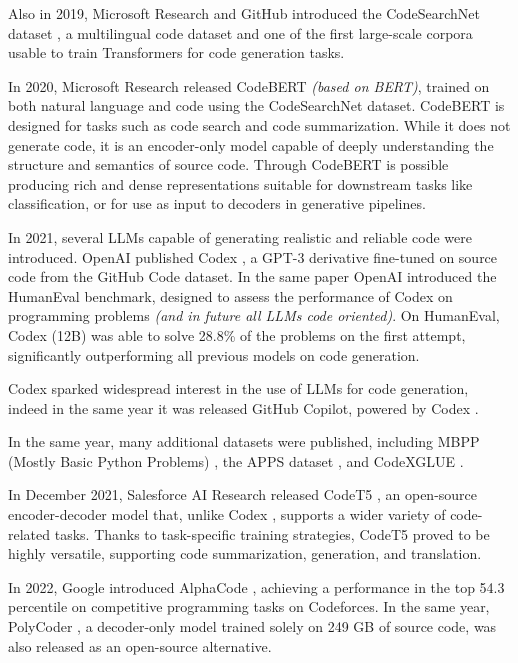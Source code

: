 Also in 2019, Microsoft Research and GitHub introduced the 
CodeSearchNet dataset \cite{husain2019codesearchnet}, a 
multilingual code dataset and one of the first large-scale 
corpora usable to train Transformers for code generation tasks.

In 2020, Microsoft Research released CodeBERT 
\cite{feng2020codebert} \textit{(based on BERT)}, 
trained on both natural 
language and code using the CodeSearchNet dataset. 
CodeBERT is designed for tasks such as code search 
and code summarization. While it does not generate code, 
it is an encoder-only model capable of deeply understanding 
the structure and semantics of source code. Through 
CodeBERT is possible producing rich 
and dense representations suitable for downstream tasks like 
classification, or for use as input to decoders in generative 
pipelines.

In 2021, several LLMs capable of generating realistic and 
reliable code were introduced. OpenAI published Codex 
\cite{chen2021codex}, a GPT-3 \cite{brown2020language} derivative fine-tuned on 
source code from the GitHub Code dataset. In the same paper 
OpenAI introduced the HumanEval benchmark, designed to assess the 
performance of Codex \cite{chen2021codex} on programming problems 
\textit{(and in future all LLMs code oriented)}.
On HumanEval, Codex (12B) was able to solve 28.8\% 
of the problems on the 
first attempt, significantly outperforming all previous 
models on code generation.

Codex \cite{chen2021codex} sparked widespread interest in the use of LLMs 
for code generation, indeed in the same year it was released 
GitHub Copilot, powered by Codex \cite{chen2021codex}.

In the same year, 
many additional datasets were 
published, including MBPP (Mostly Basic Python Problems) 
\cite{austin2021program}, the APPS dataset \cite{hendrycks2021measuring}, 
and CodeXGLUE \cite{lu2021codexglue}.

In December 2021, Salesforce AI Research released CodeT5 
\cite{wang2021codet5}, an open-source encoder-decoder 
model that, unlike Codex \cite{chen2021codex}, supports a wider variety of 
code-related tasks. Thanks to task-specific training strategies, 
CodeT5 proved to be highly versatile, supporting code 
summarization, generation, and translation.

In 2022, Google introduced AlphaCode \cite{li2022competition}, 
achieving a performance in the top 54.3 percentile on 
competitive programming tasks on Codeforces. In the same 
year, PolyCoder \cite{xu2022systematic}, a decoder-only 
model trained solely on 249 GB of source code, was also 
released as an open-source alternative. 

